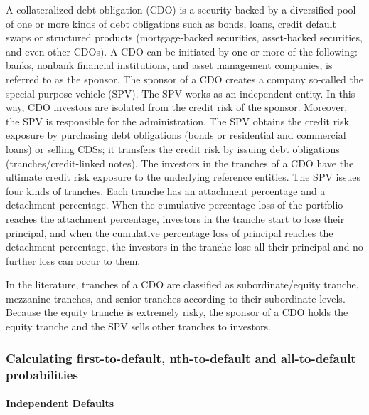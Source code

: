 A collateralized debt obligation (CDO) is a security backed by a
diversified pool of one or more kinds of debt obligations such as bonds,
loans, credit default swaps or structured products (mortgage-backed
securities, asset-backed securities, and even other CDOs). A CDO can be
initiated by one or more of the following: banks, nonbank financial
institutions, and asset management companies, is referred to as the
sponsor. The sponsor of a CDO creates a company so-called the special
purpose vehicle (SPV). The SPV works as an independent entity. In this
way, CDO investors are isolated from the credit risk of the sponsor.
Moreover, the SPV is responsible for the administration. The SPV obtains
the credit risk exposure by purchasing debt obligations (bonds or
residential and commercial loans) or selling CDSs; it transfers the
credit risk by issuing debt obligations (tranches/credit-linked notes).
The investors in the tranches of a CDO have the ultimate credit risk
exposure to the underlying reference entities. The SPV issues four kinds
of tranches. Each tranche has an attachment percentage and a detachment
percentage. When the cumulative percentage loss of the portfolio reaches
the attachment percentage, investors in the tranche start to lose their
principal, and when the cumulative percentage loss of principal reaches
the detachment percentage, the investors in the tranche lose all their
principal and no further loss can occur to them.

In the literature, tranches of a CDO are classified as
subordinate/equity tranche, mezzanine tranches, and senior tranches
according to their subordinate levels. Because the equity tranche is
extremely risky, the sponsor of a CDO holds the equity tranche and the
SPV sells other tranches to investors.

\hypertarget{calculating-first-to-default-nth-to-default-and-all-to-default-probabilities}{%
\subsubsection{Calculating first-to-default, nth-to-default and
all-to-default
probabilities}\label{calculating-first-to-default-nth-to-default-and-all-to-default-probabilities}}

\hypertarget{independent-defaults}{%
\paragraph{Independent Defaults}\label{independent-defaults}}

